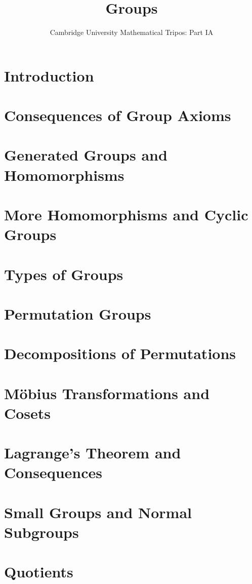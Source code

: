 \documentclass{article}
\title{Groups}
\author{Cambridge University Mathematical Tripos: Part IA}
\begin{document}
\maketitle

\tableofcontentsnewpage

\section{Introduction}

\section{Consequences of Group Axioms}

\section{Generated Groups and Homomorphisms}

\section{More Homomorphisms and Cyclic Groups}

\section{Types of Groups}

\section{Permutation Groups}

\section{Decompositions of Permutations}

\section{M\"obius Transformations and Cosets}

\section{Lagrange's Theorem and Consequences}

\section{Small Groups and Normal Subgroups}

\section{Quotients}

\end{document}
